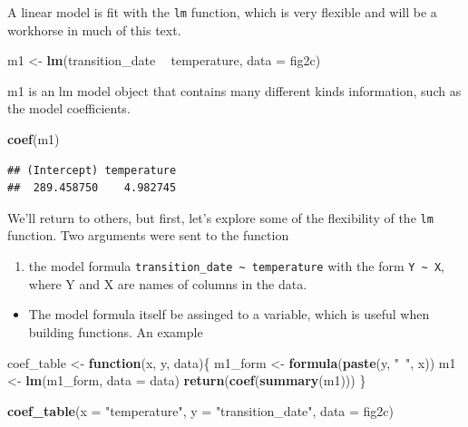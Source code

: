 \documentclass[]{book}
\newenvironment{Shaded}{\begin{snugshade}}{\end{snugshade}}
\newcommand{\ControlFlowTok}[1]{\textcolor[rgb]{0.13,0.29,0.53}{\textbf{#1}}}
\newcommand{\DataTypeTok}[1]{\textcolor[rgb]{0.13,0.29,0.53}{#1}}
\newcommand{\KeywordTok}[1]{\textcolor[rgb]{0.13,0.29,0.53}{\textbf{#1}}}
\newcommand{\NormalTok}[1]{#1}
\newcommand{\OperatorTok}[1]{\textcolor[rgb]{0.81,0.36,0.00}{\textbf{#1}}}
\newcommand{\StringTok}[1]{\textcolor[rgb]{0.31,0.60,0.02}{#1}}
\providecommand{\tightlist}{%
  \setlength{\itemsep}{0pt}\setlength{\parskip}{0pt}}
\begin{document}
A linear model is fit with the \texttt{lm} function, which is very flexible and will be a workhorse in much of this text.

\begin{Shaded}
\begin{Highlighting}[]
\NormalTok{m1 <-}\StringTok{ }\KeywordTok{lm}\NormalTok{(transition_date }\OperatorTok{~}\StringTok{ }\NormalTok{temperature, }\DataTypeTok{data =}\NormalTok{ fig2c)}
\end{Highlighting}
\end{Shaded}

m1 is an lm model object that contains many different kinds information, such as the model coefficients.

\begin{Shaded}
\begin{Highlighting}[]
\KeywordTok{coef}\NormalTok{(m1)}
\end{Highlighting}
\end{Shaded}

\begin{verbatim}
## (Intercept) temperature 
##  289.458750    4.982745
\end{verbatim}

We'll return to others, but first, let's explore some of the flexibility of the \texttt{lm} function. Two arguments were sent to the function

\begin{enumerate}
\def\labelenumi{\arabic{enumi}.}
\tightlist
\item
  the model formula \texttt{transition\_date\ \textasciitilde{}\ temperature} with the form \texttt{Y\ \textasciitilde{}\ X}, where Y and X are names of columns in the data.
\end{enumerate}

\begin{itemize}
\tightlist
\item
  The model formula itself be assinged to a variable, which is useful when building functions. An example
\end{itemize}

\begin{Shaded}
\begin{Highlighting}[]
\NormalTok{coef_table <-}\StringTok{ }\ControlFlowTok{function}\NormalTok{(x, y, data)\{}
\NormalTok{  m1_form <-}\StringTok{ }\KeywordTok{formula}\NormalTok{(}\KeywordTok{paste}\NormalTok{(y, }\StringTok{"~"}\NormalTok{, x))}
\NormalTok{  m1 <-}\StringTok{ }\KeywordTok{lm}\NormalTok{(m1_form, }\DataTypeTok{data =}\NormalTok{ data)}
  \KeywordTok{return}\NormalTok{(}\KeywordTok{coef}\NormalTok{(}\KeywordTok{summary}\NormalTok{(m1)))}
\NormalTok{\}}

\KeywordTok{coef_table}\NormalTok{(}\DataTypeTok{x =} \StringTok{"temperature"}\NormalTok{,}
           \DataTypeTok{y =} \StringTok{"transition_date"}\NormalTok{,}
           \DataTypeTok{data =}\NormalTok{ fig2c)}
\end{Highlighting}
\end{Shaded}
\end{document}
